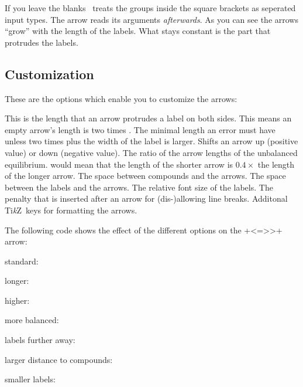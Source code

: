 \documentclass[load-preamble+]{cnltx-doc}
\newcommand*\TikZ{Ti\textit{k}Z}
\begin{document}
If you leave the blanks \chemformula\ treats the groups inside the square
brackets as seperated input types.  The arrow reads its arguments
\emph{afterwards}.  As you can see the arrows \enquote{grow} with the length
of the labels.  What stays constant is the part that protrudes the labels.
\begin{example}
   \par
   \par
   \par
   \par
  \setatomsep{15pt}
   \par
\end{example}

\subsection{Customization}
These are the options which enable you to customize the arrows:
\begin{options}
  \Default{.75em}
    This is the length that an arrow protrudes a label on both sides.  This
    means an empty arrow's length is two times .
  \Default{0pt}
    The minimal length an error must have unless two times
     plus the width of the label is larger.
  \Default{0pt}
    Shifts an arrow up (positive value) or down (negative value).
    The ratio of the arrow lengths of the unbalanced equilibrium.  
    would mean that the length of the shorter arrow is $0.4\times$ the length
    of the longer arrow.
  \Default{.5em}
    The space between compounds and the arrows.
  \Default{2pt}
    The space between the labels and the arrows.
    The relative font size of the labels.
    The penalty that is inserted after an arrow for
    (dis-)allowing line breaks.
  \keyval{arrow-style}{\TikZ}\Default
    Additonal \TikZ\ keys for formatting the arrows.
\end{options}

The following code shows the effect of the different options on the \verbcode+<=>>+
arrow:
\begin{example}
  standard:  \par
  longer:  \par
  higher:  \par
  more balanced:  \par
  labels further away:  \par
  larger distance to compounds:  \par
  smaller labels: 
\end{example}
\end{document}
